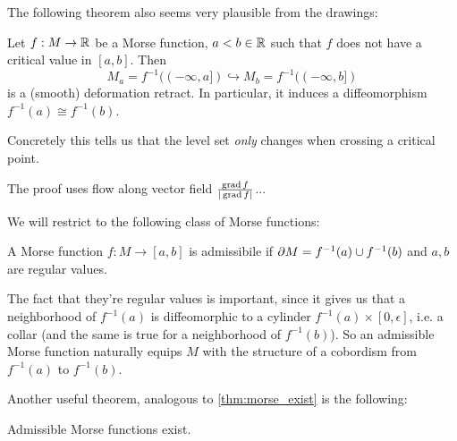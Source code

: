 The following theorem also seems very plausible from the drawings:
\begin{lem}
    Let $f: M \to \mathbb{R}$ be a Morse function, $a< b \in \mathbb{R}$ such that $f$ does not have a critical value in $[a,b]$. Then
    \begin{equation}
        M_a = f^{-1} ((-\infty, a]) \hookrightarrow M_b = f^{-1} ((-\infty, b])
    \end{equation}
    is a (smooth) deformation retract. In particular, it induces a diffeomorphism $f^{-1}(a) \cong f^{-1}(b)$.
\end{lem}
\noindent Concretely this tells us that the level set \textit{only} changes when crossing a critical point.
\begin{rem}
    The proof uses flow along vector field $\frac{\operatorname{grad} f}{|\operatorname{grad} f|}$... %
\end{rem}

We will restrict to the following class of Morse functions:
\begin{defn}
    A Morse function $f: M \to [a,b]$ is admissibile if $\partial M = f^{-1}(a) \cup f^{-1}(b)$ and $a,b$ are regular values.
\end{defn}
\noindent The fact that they're regular values is important, since it gives us that a neighborhood of $f^{-1}(a)$ is diffeomorphic to a cylinder $f^{-1}(a) \times [0, \epsilon]$, i.e. a collar (and the same is true for a neighborhood of $f^{-1}(b)$). So an admissible Morse function naturally equips $M$ with the structure of a cobordism from $f^{-1}(a)$ to $f^{-1}(b)$.

\noindent Another useful theorem, analogous to \ref{thm:morse_exist} is the following:
\begin{thm}
    Admissible Morse functions exist.
\end{thm}

